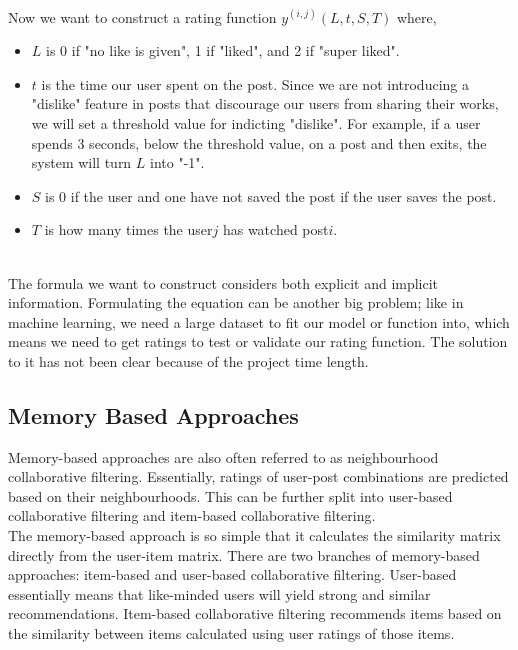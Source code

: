 \\Now we want to construct a rating function $y^{(i,j)}(L,t,S,T)$ where, 
\begin{itemize}
\item$L$ is 0 if "no like is given", 1 if "liked", and 2 if "super liked".
\item$t$ is the time our user spent on the post. Since we are not introducing a "dislike" feature in posts that discourage our users from sharing their works, we will set a threshold value for indicting "dislike". For example, if a user spends 3 seconds, below the threshold value, on a post and then exits, the system will turn $L$ into "-1".
\item$S$ is 0 if the user and one have not saved the post if the user saves the post.
\item$T$ is how many times the user$j$ has watched post$i$.
\end{itemize}
\\The formula we want to construct considers both explicit and implicit information. Formulating the equation can be another big problem; like in machine learning, we need a large dataset to fit our model or function into, which means we need to get ratings to test or validate our rating function. The solution to it has not been clear because of the project time length.

\subsection{Memory Based Approaches}
Memory-based approaches are also often referred to as neighbourhood collaborative filtering. Essentially, ratings of user-post combinations are predicted based on their neighbourhoods. 
This can be further split into user-based collaborative filtering and item-based collaborative filtering. 
\\The memory-based approach is so simple that it calculates the similarity matrix directly from the user-item matrix. There are two branches of memory-based approaches: item-based and user-based collaborative filtering. User-based essentially means that like-minded users will yield strong and similar recommendations. Item-based collaborative filtering recommends items based on the similarity between items calculated using user ratings of those items.
